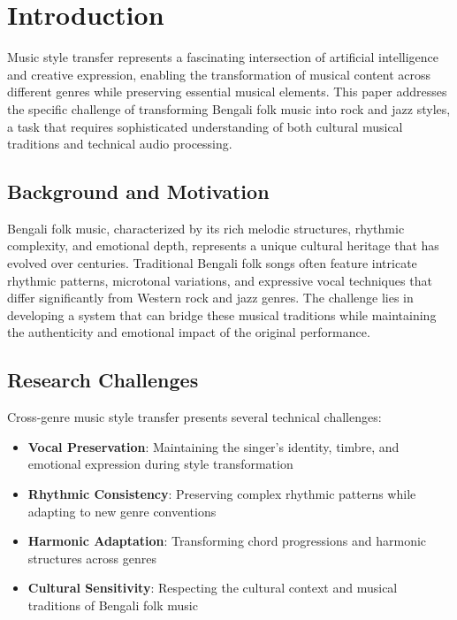 \documentclass[conference]{IEEEtran}
\begin{document}
\section{Introduction}
Music style transfer represents a fascinating intersection of artificial intelligence and creative expression, enabling the transformation of musical content across different genres while preserving essential musical elements. This paper addresses the specific challenge of transforming Bengali folk music into rock and jazz styles, a task that requires sophisticated understanding of both cultural musical traditions and technical audio processing.

\subsection{Background and Motivation}
Bengali folk music, characterized by its rich melodic structures, rhythmic complexity, and emotional depth, represents a unique cultural heritage that has evolved over centuries. Traditional Bengali folk songs often feature intricate rhythmic patterns, microtonal variations, and expressive vocal techniques that differ significantly from Western rock and jazz genres. The challenge lies in developing a system that can bridge these musical traditions while maintaining the authenticity and emotional impact of the original performance.

\subsection{Research Challenges}
Cross-genre music style transfer presents several technical challenges:
\begin{itemize}
\item \textbf{Vocal Preservation}: Maintaining the singer's identity, timbre, and emotional expression during style transformation
\item \textbf{Rhythmic Consistency}: Preserving complex rhythmic patterns while adapting to new genre conventions
\item \textbf{Harmonic Adaptation}: Transforming chord progressions and harmonic structures across genres
\item \textbf{Cultural Sensitivity}: Respecting the cultural context and musical traditions of Bengali folk music
\end{itemize}
\end{document}
